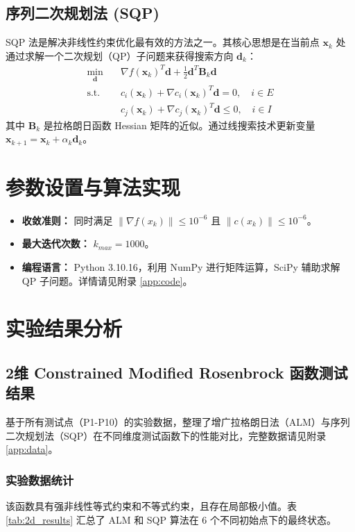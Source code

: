 \documentclass[a4paper,12pt]{article}
\begin{document}
\subsection{序列二次规划法 (SQP)}
SQP 法是解决非线性约束优化最有效的方法之一。其核心思想是在当前点 $\bm{x}_k$ 处通过求解一个二次规划（QP）子问题来获得搜索方向 $\bm{d}_k$：
\begin{equation}
    \begin{aligned}
        \min_{\bm{d}} \quad & \nabla f(\bm{x}_k)^T \bm{d} + \frac{1}{2} \bm{d}^T \bm{B}_k \bm{d} \\
        \text{s.t.} \quad & c_i(\bm{x}_k) + \nabla c_i(\bm{x}_k)^T \bm{d} = 0, \quad i \in E \\
        & c_j(\bm{x}_k) + \nabla c_j(\bm{x}_k)^T \bm{d} \le 0, \quad i \in I
    \end{aligned}
\end{equation}
其中 $\bm{B}_k$ 是拉格朗日函数 Hessian 矩阵的近似。通过线搜索技术更新变量 $\bm{x}_{k+1} = \bm{x}_k + \alpha_k \bm{d}_k$。

\section{参数设置与算法实现}
\begin{itemize}
    \item \textbf{收敛准则：} 同时满足 $\|\nabla f(x_k)\| \le 10^{-6}$ 且 $\|c(x_k)\| \le 10^{-6}$。
    \item \textbf{最大迭代次数：} $k_{max} = 1000$。
    \item \textbf{编程语言：} Python 3.10.16，利用 NumPy 进行矩阵运算，SciPy 辅助求解 QP 子问题。详情请见附录 \ref{app:code}。
\end{itemize}


\section{实验结果分析}

\subsection{2维 Constrained Modified Rosenbrock 函数测试结果}
基于所有测试点（P1-P10）的实验数据，整理了增广拉格朗日法（ALM）与序列二次规划法（SQP）在不同维度测试函数下的性能对比，完整数据请见附录 \ref{app:data}。

\subsubsection{实验数据统计}
该函数具有强非线性等式约束和不等式约束，且存在局部极小值。表 \ref{tab:2d_results} 汇总了 ALM 和 SQP 算法在 6 个不同初始点下的最终状态。
\end{document}

